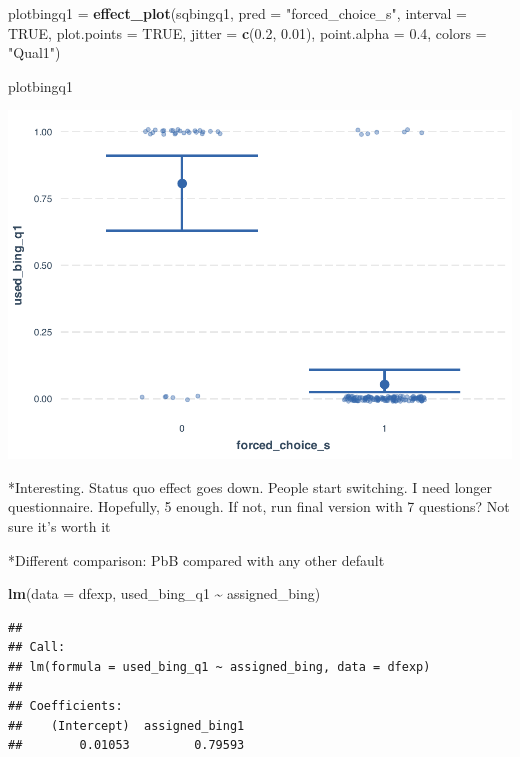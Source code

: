 \documentclass[
  11pt,
]{article}
\newenvironment{Shaded}{\begin{snugshade}}{\end{snugshade}}
\newcommand{\AttributeTok}[1]{\textcolor[rgb]{0.13,0.29,0.53}{#1}}
\newcommand{\ConstantTok}[1]{\textcolor[rgb]{0.56,0.35,0.01}{#1}}
\newcommand{\FloatTok}[1]{\textcolor[rgb]{0.00,0.00,0.81}{#1}}
\newcommand{\FunctionTok}[1]{\textcolor[rgb]{0.13,0.29,0.53}{\textbf{#1}}}
\newcommand{\NormalTok}[1]{#1}
\newcommand{\OtherTok}[1]{\textcolor[rgb]{0.56,0.35,0.01}{#1}}
\newcommand{\SpecialCharTok}[1]{\textcolor[rgb]{0.81,0.36,0.00}{\textbf{#1}}}
\newcommand{\StringTok}[1]{\textcolor[rgb]{0.31,0.60,0.02}{#1}}
\begin{document}
\begin{Shaded}
\begin{Highlighting}[]
\NormalTok{plotbingq1 }\OtherTok{=} \FunctionTok{effect\_plot}\NormalTok{(sqbingq1, }\AttributeTok{pred =} \StringTok{"forced\_choice\_s"}\NormalTok{, }\AttributeTok{interval =} \ConstantTok{TRUE}\NormalTok{, }\AttributeTok{plot.points =} \ConstantTok{TRUE}\NormalTok{, }\AttributeTok{jitter =} \FunctionTok{c}\NormalTok{(}\FloatTok{0.2}\NormalTok{, }\FloatTok{0.01}\NormalTok{), }\AttributeTok{point.alpha =} \FloatTok{0.4}\NormalTok{, }\AttributeTok{colors =} \StringTok{"Qual1"}\NormalTok{)}

\NormalTok{plotbingq1}
\end{Highlighting}
\end{Shaded}

\includegraphics{analysis-July19_files/figure-latex/unnamed-chunk-14-1.pdf}

*Interesting. Status quo effect goes down. People start switching. I need longer questionnaire. Hopefully, 5 enough. If not, run final version with 7 questions? Not sure it's worth it

*Different comparison: Pb\textbar B compared with any other default

\begin{Shaded}
\begin{Highlighting}[]
\FunctionTok{lm}\NormalTok{(}\AttributeTok{data =}\NormalTok{ dfexp, used\_bing\_q1 }\SpecialCharTok{\textasciitilde{}}\NormalTok{ assigned\_bing)}
\end{Highlighting}
\end{Shaded}

\begin{verbatim}
## 
## Call:
## lm(formula = used_bing_q1 ~ assigned_bing, data = dfexp)
## 
## Coefficients:
##    (Intercept)  assigned_bing1  
##        0.01053         0.79593
\end{verbatim}
\end{document}
